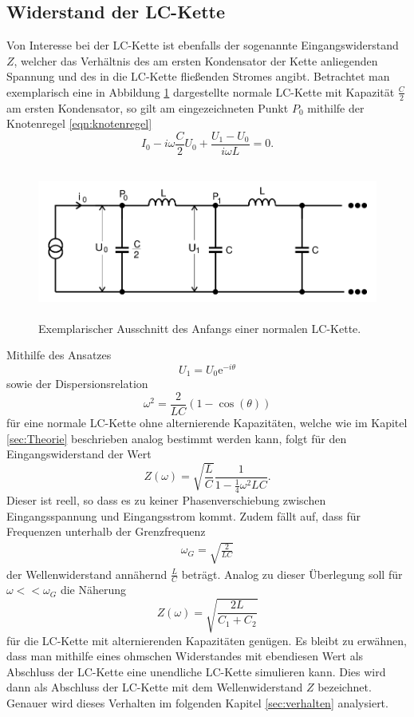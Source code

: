 \subsection{Widerstand der LC-Kette}
\label{sec:widerstand}
Von Interesse bei der LC-Kette ist ebenfalls der sogenannte Eingangswiderstand $Z$, welcher das Verhältnis des am ersten Kondensator der Kette anliegenden Spannung und des in die LC-Kette fließenden Stromes angibt.
Betrachtet man exemplarisch eine in Abbildung \ref{tfig:4} dargestellte normale LC-Kette mit Kapazität $\frac{C}{2}$ am ersten Kondensator, so gilt am eingezeichneten Punkt $P_0$ mithilfe der Knotenregel \eqref{eqn:knotenregel}
\begin{equation}
  I_0 - i \omega \frac{C}{2} U_0 + \frac{U_1 - U_0}{i \omega L} = 0.
\end{equation}
\begin{figure}[H]
  \centering
  \includegraphics[height=5cm]{wellenwiderstand.png}
  \caption{Exemplarischer Ausschnitt des Anfangs einer normalen LC-Kette.}
  \label{tfig:4}
\end{figure}
Mithilfe des Ansatzes
\begin{equation}
  U_1 = U_0 \mathrm{e}^{-i \theta}
\end{equation}
sowie der Dispersionsrelation
\begin{equation}
  \omega^2 = \frac{2}{LC} (1-\cos{(\theta)})
\end{equation}
für eine normale LC-Kette ohne alternierende Kapazitäten, welche wie im Kapitel \ref{sec:Theorie} beschrieben analog bestimmt werden kann, folgt für den Eingangswiderstand der Wert
\begin{equation}
Z(\omega) = \sqrt{\frac{L}{C}} \frac{1}{1 - \frac{1}{4} \omega^2 L C}.
\end{equation}
Dieser ist reell, so dass es zu keiner Phasenverschiebung zwischen Eingangsspannung und Eingangsstrom kommt.
Zudem fällt auf, dass für Frequenzen unterhalb der Grenzfrequenz
\begin{align*}
  \omega_G = \sqrt{\frac{2}{LC}}
\end{align*}
der Wellenwiderstand annähernd $\frac{L}{C}$ beträgt.
Analog zu dieser Überlegung soll für $\omega << \omega_G$ die Näherung
\begin{equation}
  \label{eqn:irgendwas}
  Z(\omega) = \sqrt{\frac{2L}{C_1 + C_2}}
\end{equation}
für die LC-Kette mit alternierenden Kapazitäten genügen.
Es bleibt zu erwähnen, dass man mithilfe eines ohmschen Widerstandes mit ebendiesen Wert als Abschluss der LC-Kette eine unendliche LC-Kette simulieren kann.
Dies wird dann als Abschluss der LC-Kette mit dem Wellenwiderstand $Z$ bezeichnet.
Genauer wird dieses Verhalten im folgenden Kapitel \ref{sec:verhalten} analysiert.
